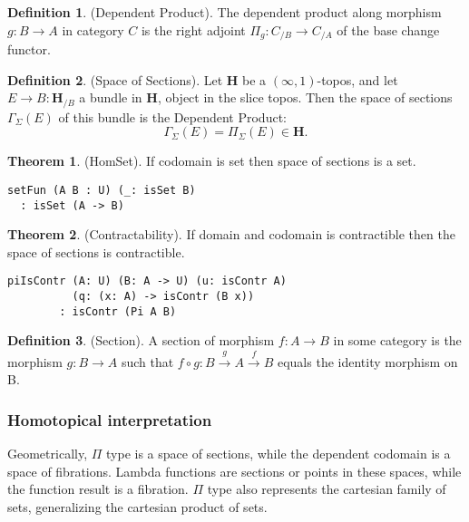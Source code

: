 \documentclass{article}
\theoremstyle{definition}
\newtheorem{theorem}{Theorem}
\newtheorem{definition}{Definition}
\begin{document}
\begin{definition} (Dependent Product).
The dependent product along morphism $g: B \rightarrow A$ in category $C$ is the right
adjoint $\Pi_g : C_{/B} \rightarrow C_{/A}$ of the base change functor.
\end{definition}

\begin{definition} (Space of Sections).
Let $\mathbf{H}$ be a $(\infty,1)$-topos, and let $E \rightarrow B : \mathbf{H}_{/B}$ a bundle in
$\mathbf{H}$, object in the slice topos. Then the space of sections $\Gamma_\Sigma(E)$
of this bundle is the Dependent Product:
$$ \Gamma_\Sigma(E) = \Pi_\Sigma (E) \in \mathbf{H}. $$
\end{definition}

\begin{theorem} (HomSet).
If codomain is set then space of sections is a set.
\begin{lstlisting}
setFun (A B : U) (_: isSet B)
  : isSet (A -> B)
\end{lstlisting}
\end{theorem}

\begin{theorem} (Contractability).
If domain and codomain is contractible then the space of sections is contractible.
\begin{lstlisting}
piIsContr (A: U) (B: A -> U) (u: isContr A)
          (q: (x: A) -> isContr (B x))
        : isContr (Pi A B)
\end{lstlisting}
\end{theorem}

\begin{definition} (Section).
A section of morphism $f: A \rightarrow B$ in some category is the morphism $g: B \rightarrow A$
such that $f \circ g: B \xrightarrow{g} A \xrightarrow{f} B$ equals the identity morphism on B.
\end{definition}

\subsubsection*{Homotopical interpretation}

Geometrically, $\Pi$ type is a space of sections, while the dependent codomain is a space of fibrations.
Lambda functions are sections or points in these spaces, while the function result is a fibration.
$\Pi$ type also represents the cartesian family of sets, generalizing the cartesian product of sets.
\end{document}
